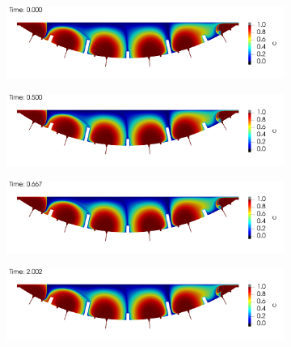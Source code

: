         \begin{figure}
            \centering
            \begin{subfigure}{\textwidth}
                \includegraphics[width=\textwidth]{diagrams/results-modelling/velocity-transport-oscillating/placenta-transport/transport.0000.png}
                \caption{}
                \label{fig:oscillating-inlet-transport:1}
            \end{subfigure}
            \begin{subfigure}{\textwidth}
                \includegraphics[width=\textwidth]{diagrams/results-modelling/velocity-transport-oscillating/placenta-transport/transport.0015.png}
                \caption{}
                \label{fig:oscillating-inlet-transport:2}
            \end{subfigure}
            \begin{subfigure}{\textwidth}
                \includegraphics[width=\textwidth]{diagrams/results-modelling/velocity-transport-oscillating/placenta-transport/transport.0020.png}
                \caption{}
                \label{fig:oscillating-inlet-transport:3}
            \end{subfigure}
            \begin{subfigure}{\textwidth}
                \includegraphics[width=\textwidth]{diagrams/results-modelling/velocity-transport-oscillating/placenta-transport/transport.0060.png}

\end{subfigure}
\end{figure}
